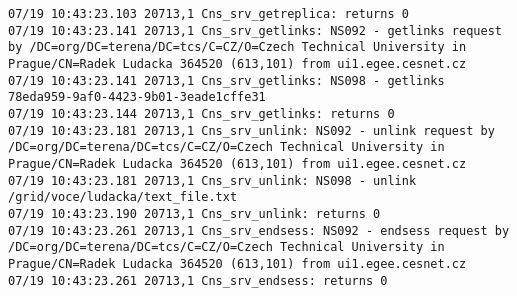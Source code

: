 \documentclass[a4paper, 11pt]{article} %
\begin{document}
\begin{lstlisting}[label={log:del3},caption={lcg-del -a lfn:/grid/voce/ludacka/text\_file.txt - deletes all replicas and alisses. In this example: deletes 2 replicas}]
07/19 10:43:23.103 20713,1 Cns_srv_getreplica: returns 0
07/19 10:43:23.141 20713,1 Cns_srv_getlinks: NS092 - getlinks request by /DC=org/DC=terena/DC=tcs/C=CZ/O=Czech Technical University in Prague/CN=Radek Ludacka 364520 (613,101) from ui1.egee.cesnet.cz
07/19 10:43:23.141 20713,1 Cns_srv_getlinks: NS098 - getlinks  78eda959-9af0-4423-9b01-3eade1cffe31
07/19 10:43:23.144 20713,1 Cns_srv_getlinks: returns 0
07/19 10:43:23.181 20713,1 Cns_srv_unlink: NS092 - unlink request by /DC=org/DC=terena/DC=tcs/C=CZ/O=Czech Technical University in Prague/CN=Radek Ludacka 364520 (613,101) from ui1.egee.cesnet.cz
07/19 10:43:23.181 20713,1 Cns_srv_unlink: NS098 - unlink /grid/voce/ludacka/text_file.txt
07/19 10:43:23.190 20713,1 Cns_srv_unlink: returns 0
07/19 10:43:23.261 20713,1 Cns_srv_endsess: NS092 - endsess request by /DC=org/DC=terena/DC=tcs/C=CZ/O=Czech Technical University in Prague/CN=Radek Ludacka 364520 (613,101) from ui1.egee.cesnet.cz
07/19 10:43:23.261 20713,1 Cns_srv_endsess: returns 0
\end{lstlisting}
\end{document}
